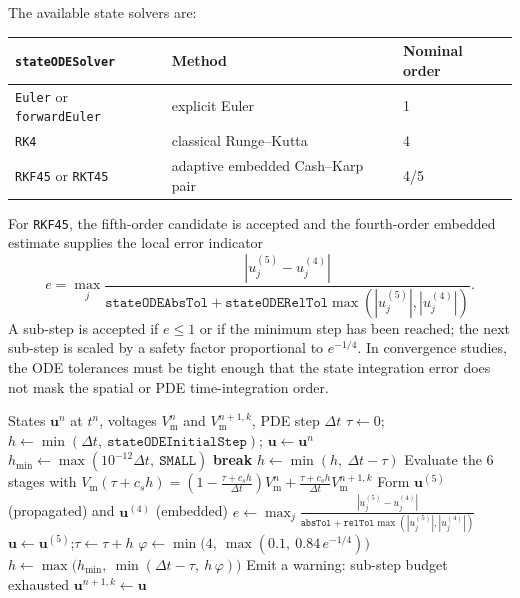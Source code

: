 \documentclass[11pt,a4paper]{article}
\newcommand{\code}[1]{\texttt{\small #1}}
\newcommand{\Vm}{V_{\text{m}}}
\begin{document}
The available state solvers are:
\begin{center}
\begin{tabular}{@{}lll@{}}
\toprule
\code{stateODESolver} & Method & Nominal order \\
\midrule
\code{Euler} or \code{forwardEuler} & explicit Euler & 1 \\
\code{RK4} & classical Runge--Kutta & 4 \\
\code{RKF45} or \code{RKT45} & adaptive embedded Cash--Karp pair & 4/5 \\
\bottomrule
\end{tabular}
\end{center}
For \code{RKF45}, the fifth-order candidate is accepted and the fourth-order
embedded estimate supplies the local error indicator
\begin{equation}
  e =
  \max_j
  \frac{|u^{(5)}_j-u^{(4)}_j|}
       {\texttt{stateODEAbsTol}+
        \texttt{stateODERelTol}\max(|u^{(5)}_j|,|u^{(4)}_j|)}.
\end{equation}
A sub-step is accepted if $e\le 1$ or if the minimum step has been reached; the
next sub-step is scaled by a safety factor proportional to $e^{-1/4}$. In
convergence studies, the ODE tolerances must be tight enough that the state
integration error does not mask the spatial or PDE time-integration order.

\begin{algorithm}[h!]
\caption{Adaptive sub-step control of the embedded 5(4) pair inside one PDE
time step}
\label{alg:rkf45}
\begin{algorithmic}[1]
\Require States $\mathbf{u}^n$ at $t^n$, voltages $\Vm^n$ and $\Vm^{n+1,k}$, PDE step $\Delta t$
\State $\tau \gets 0$;\quad
       $h \gets \min(\Delta t,\ \texttt{stateODEInitialStep})$;\quad
       $\mathbf{u} \gets \mathbf{u}^n$
\State $h_{\min} \gets \max(10^{-12}\Delta t,\ \texttt{SMALL})$
   \State \textbf{break} \EndIf
  \State $h \gets \min(h,\ \Delta t-\tau)$
  \State Evaluate the 6 stages with $\Vm(\tau+c_sh)=(1-\tfrac{\tau+c_sh}{\Delta t})\Vm^n+\tfrac{\tau+c_sh}{\Delta t}\Vm^{n+1,k}$
  \State Form $\mathbf{u}^{(5)}$ (propagated) and $\mathbf{u}^{(4)}$ (embedded)
  \State $e \gets \displaystyle\max_{j}
         \frac{|u^{(5)}_j-u^{(4)}_j|}
              {\texttt{absTol}+\texttt{relTol}\max(|u^{(5)}_j|,|u^{(4)}_j|)}$
    \State $\mathbf{u} \gets \mathbf{u}^{(5)}$;\quad $\tau \gets \tau + h$
  \Else
  \EndIf
  \State $\varphi \gets \min\!\big(4,\ \max(0.1,\ 0.84\,e^{-1/4})\big)$
  \State $h \gets \max\!\big(h_{\min},\ \min(\Delta t-\tau,\ h\,\varphi)\big)$
\EndFor
{}
  \State Emit a warning: sub-step budget exhausted
\EndIf
\Ensure $\mathbf{u}^{n+1,k} \gets \mathbf{u}$
\end{algorithmic}
\end{algorithm}
\end{document}
